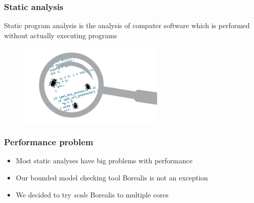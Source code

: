 

\begin{frame}
	\frametitle{Static analysis}

	\begin{block}{}
	\centering
	Static program analysis is the analysis of computer software which is performed without actually executing programs
	\end{block}
		
	\begin{figure}
	\includegraphics[width=70mm]{image/staticAnalysis}
	\end{figure}	
	
\end{frame}



\begin{frame}
	\frametitle{Performance problem}
	\begin{itemize}
		\item Most static analyses have big problems with performance
		\item Our bounded model checking tool Borealis is not an exception
		\item We decided to try \textit{scale} Borealis to multiple cores
	\end{itemize}
\end{frame}



